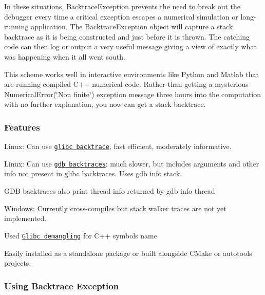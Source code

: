 In these situations, Backtrace\+Exception prevents the need to break out the debugger every time a critical exception escapes a numerical simulation or long-\/running application. The Backtrace\+Exception object will capture a stack backtrace as it is being constructed and just before it is thrown. The catching code can then log or output a very useful message giving a view of exactly what was happening when it all went south.

This scheme works well in interactive environments like Python and Matlab that are running compiled C++ numerical code. Rather than getting a mysterious {\ttfamily Numerical\+Error(\char`\"{}\+Non finite\char`\"{})} exception message three hours into the computation with no further explanation, you now can get a stack backtrace.

\subsubsection*{Features}


\begin{DoxyItemize}
\item Linux\+: Can use \href{https://www.gnu.org/software/libc/manual/html_node/Backtraces.html}{\tt glibc backtrace}, fast efficient, moderately informative.
\item Linux\+: Can use \href{https://ftp.gnu.org/old-gnu/Manuals/gdb/html_node/gdb_42.html}{\tt gdb backtraces}\+: much slower, but includes arguments and other info not present in glibc backtraces. Uses {\ttfamily gdb info stack}.
\begin{DoxyItemize}
\item G\+DB backtraces also print thread info returned by {\ttfamily gdb info thread}
\end{DoxyItemize}
\item Windows\+: Currently cross-\/compiles but stack walker traces are not yet implemented.
\item Used \href{https://gcc.gnu.org/onlinedocs/libstdc++/manual/ext_demangling.html}{\tt Glibc demangling} for C++ symbols name
\item Easily installed as a standalone package or built alongside C\+Make or autotools projects.
\end{DoxyItemize}

\subsubsection*{Using Backtrace Exception}

